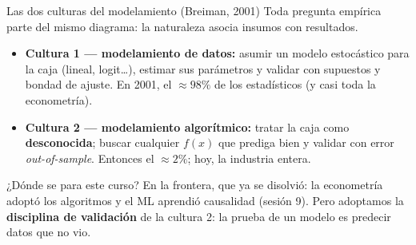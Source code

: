 \documentclass{beamer}
\newcommand{\1}{\mathbb{I}}
\begin{document}
\begin{frame}{Las dos culturas del modelamiento (Breiman, 2001)}
\small
Toda pregunta empírica parte del mismo diagrama: la naturaleza asocia insumos con resultados.

\vspace{0.2cm}
\begin{center}
\end{center}
\pause

\begin{itemize}\itemsep5pt
  \item \textbf{Cultura 1 --- modelamiento de datos:} asumir un modelo estocástico para la caja (lineal, logit\ldots), estimar sus parámetros y validar con supuestos y bondad de ajuste. En 2001, el $\approx 98\%$ de los estadísticos (y casi toda la econometría). \pause
  \item \textbf{Cultura 2 --- modelamiento algorítmico:} tratar la caja como \textbf{desconocida}; buscar cualquier $f(x)$ que prediga bien y validar con error \emph{out-of-sample}. Entonces el $\approx 2\%$; hoy, la industria entera. \pause
\end{itemize}

\begin{block}{¿Dónde se para este curso?}
En la frontera, que ya se disolvió: la econometría adoptó los algoritmos y el ML aprendió causalidad (sesión 9). Pero adoptamos la \textbf{disciplina de validación} de la cultura 2: la prueba de un modelo es predecir datos que no vio.
\end{block}
\end{frame}
\end{document}
